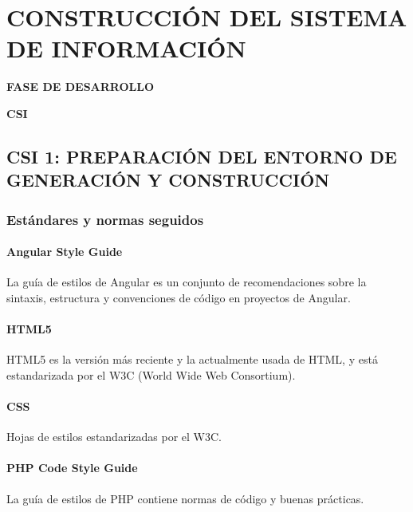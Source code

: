 \newpage
\chapter{CONSTRUCCIÓN DEL SISTEMA DE INFORMACIÓN}
	\vspace{2cm}	
	\begin{center}
	{\Large \textbf{FASE DE DESARROLLO} \par}
	\end{center}
	\vspace{5cm}
	
	\begin{center}
	\Huge \textbf{CSI}\par
	\end{center}

\newpage


\section[CSI 1: PREPARACIÓN DEL ENTORNO DE GENERACIÓN Y \\ CONSTRUCCIÓN]{CSI 1: PREPARACIÓN DEL ENTORNO DE GENERACIÓN Y CONSTRUCCIÓN}

\subsection{Estándares y normas seguidos}
\subsubsection{Angular Style Guide}
La guía de estilos de Angular\cite{AngularSG} es un conjunto de recomendaciones sobre la sintaxis, estructura y convenciones de código en proyectos de Angular.
\subsubsection{HTML5}
HTML5 es la versión más reciente y la actualmente usada de HTML, y está estandarizada por el W3C (World Wide Web Consortium).
\subsubsection{CSS}
Hojas de estilos estandarizadas por el W3C.
\subsubsection{PHP Code Style Guide}
La guía de estilos de PHP\cite{PhpSG} contiene normas de código y buenas prácticas.

